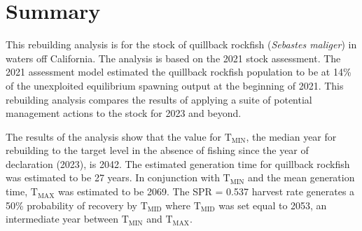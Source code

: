 \documentclass[11pt,
  english,
  a4paper,
]{article}
\begin{document}
\newcommand{\lt}{\ensuremath <}
\newcommand{\gt}{\ensuremath >}


\pagebreak
{}
\setcounter{page}{1}

\renewcommand{\thetable}{\roman{table}}
\renewcommand{\thefigure}{\roman{figure}}

\setlength\parskip{0.5em plus 0.1em minus 0.2em}


\hypertarget{summary}{%
\section*{Summary}\label{summary}}

\leavevmode\tagmcend\tagstructend


This rebuilding analysis is for the stock of quillback rockfish (\emph{Sebastes maliger}) in waters off California. The analysis is based on the 2021 stock assessment. The 2021 assessment model estimated the quillback rockfish population to be at 14\% of the unexploited equilibrium spawning output at the beginning of 2021. This rebuilding analysis compares the results of applying a suite of potential management actions to the stock for 2023 and beyond.

\leavevmode\tagmcend\tagstructend\par


The results of the analysis show that the value for {\(\text{T}_\text{MIN}\)\leavevmode\tagmcend\tagstructend}, the median year for rebuilding to the target level in the absence of fishing since the year of declaration (2023), is 2042. The estimated generation time for quillback rockfish was estimated to be 27 years. In conjunction with {\(\text{T}_\text{MIN}\)\leavevmode\tagmcend\tagstructend} and the mean generation time, {\(\text{T}_\text{MAX}\)\leavevmode\tagmcend\tagstructend} was estimated to be 2069. The SPR = 0.537 harvest rate generates a 50\% probability of recovery by {\(\text{T}_\text{MID}\)\leavevmode\tagmcend\tagstructend} where {\(\text{T}_\text{MID}\)\leavevmode\tagmcend\tagstructend} was set equal to 2053, an intermediate year between {\(\text{T}_\text{MIN}\)\leavevmode\tagmcend\tagstructend} and {\(\text{T}_\text{MAX}\)\leavevmode\tagmcend\tagstructend}.
\end{document}
